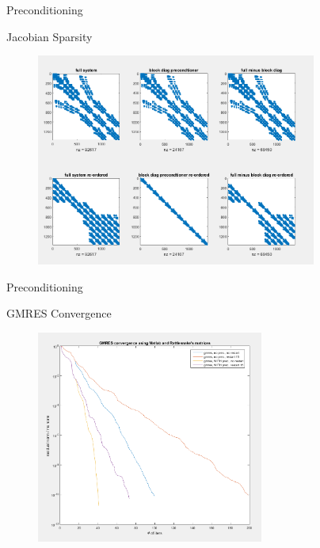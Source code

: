 \documentclass[8pt,xcolor=dvipnames]{beamer}
\begin{document}
\begin{frame}{Preconditioning}

\vspace{-2mm}

\begin{block}{Jacobian Sparsity}
\begin{figure}
\includegraphics[height=2.75in]{figures/jacobian.png}
\end{figure}
\end{block}


\end{frame}

\begin{frame}{Preconditioning}

\vspace{-2mm}

\begin{block}{GMRES Convergence}
\begin{figure}
\includegraphics[height=2.75in]{figures/gmres_convergence.png}
\end{figure}
\end{block}


\end{frame}
\end{document}
